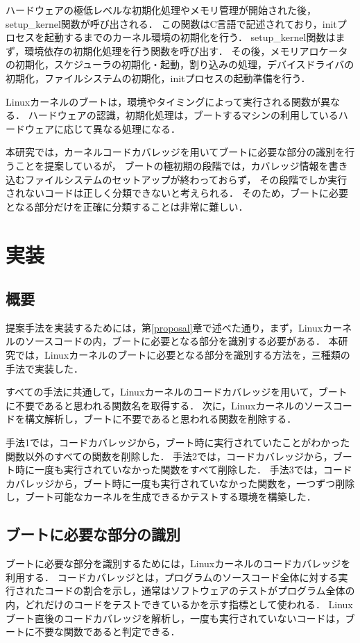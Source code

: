\documentclass[graduation-thesis]{mlarticle}
\begin{document}
ハードウェアの極低レベルな初期化処理やメモリ管理が開始された後，setup\_kernel関数が呼び出される．
この関数はC言語で記述されており，initプロセスを起動するまでのカーネル環境の初期化を行う．
setup\_kernel関数はまず，環境依存の初期化処理を行う関数を呼び出す．
その後，メモリアロケータの初期化，スケジューラの初期化・起動，割り込みの処理，デバイスドライバの初期化，ファイルシステムの初期化，initプロセスの起動準備を行う．

Linuxカーネルのブートは，環境やタイミングによって実行される関数が異なる．
ハードウェアの認識，初期化処理は，ブートするマシンの利用しているハードウェアに応じて異なる処理になる．

本研究では，カーネルコードカバレッジを用いてブートに必要な部分の識別を行うことを提案しているが，
ブートの極初期の段階では，カバレッジ情報を書き込むファイルシステムのセットアップが終わっておらず，
その段階でしか実行されないコードは正しく分類できないと考えられる．
そのため，ブートに必要となる部分だけを正確に分類することは非常に難しい．


\clearpage
\section{実装}
\label{implementation}
\subsection{概要}
\label{implementation:abstruction}
提案手法を実装するためには，第\ref{proposal}章で述べた通り，まず，Linuxカーネルのソースコードの内，ブートに必要となる部分を識別する必要がある．
本研究では，Linuxカーネルのブートに必要となる部分を識別する方法を，三種類の手法で実装した．

すべての手法に共通して，Linuxカーネルのコードカバレッジを用いて，ブートに不要であると思われる関数名を取得する．
次に，Linuxカーネルのソースコードを構文解析し，ブートに不要であると思われる関数を削除する．

手法1では，コードカバレッジから，ブート時に実行されていたことがわかった関数以外のすべての関数を削除した．
手法2では，コードカバレッジから，ブート時に一度も実行されていなかった関数をすべて削除した．
手法3では，コードカバレッジから，ブート時に一度も実行されていなかった関数を，一つずつ削除し，ブート可能なカーネルを生成できるかテストする環境を構築した．


\subsection{ブートに必要な部分の識別}
\label{implementation:boot}
ブートに必要な部分を識別するためには，Linuxカーネルのコードカバレッジを利用する．
コードカバレッジとは，プログラムのソースコード全体に対する実行されたコードの割合を示し，通常はソフトウェアのテストがプログラム全体の内，どれだけのコードをテストできているかを示す指標として使われる．
Linuxブート直後のコードカバレッジを解析し，一度も実行されていないコードは，ブートに不要な関数であると判定できる．
\end{document}
